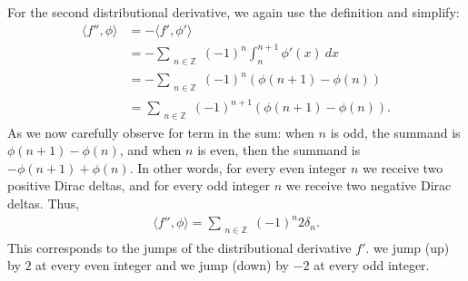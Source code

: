 \documentclass[11pt]{article}
\begin{document}
\begin{solution}
    For the second distributional derivative, we again use the definition and simplify:
    \begin{align}
        \langle f'', \phi \rangle 
        &
        = 
        -
        \langle f', \phi' \rangle 
        \\&
        = 
        -
        \sum_{\substack{n \in \mathbb{Z} }} (-1)^{n} \int_{n}^{n+1} \phi'(x) \ dx
        \\&
        = 
        -
        \sum_{\substack{n \in \mathbb{Z} }} (-1)^{n} \left( \phi(n+1) - \phi(n) \right)
        \\&
        = 
        \sum_{\substack{n \in \mathbb{Z} }} (-1)^{n+1} \left( \phi(n+1) - \phi(n) \right)
        .
    \end{align}
    As we now carefully observe for term in the sum:
    when $n$ is odd, the summand is $\phi(n+1) - \phi(n)$, and when $n$ is even, then the summand is $- \phi(n+1) + \phi(n)$. 
    In other words, for every even integer $n$ we receive two positive Dirac deltas, and for every odd integer $n$ we receive two negative Dirac deltas. 
    Thus,
    \begin{align}
        \langle f'', \phi \rangle 
        =
        \sum_{\substack{n \in \mathbb{Z} }} (-1)^{n} 2 \delta_{n}
        .
    \end{align}
	This corresponds to the jumps of the distributional derivative $f'$.
	we jump (up)   by  $2$ at every even integer 
	and 
	we jump (down) by $-2$ at every odd integer.
\end{solution}
\end{document}
